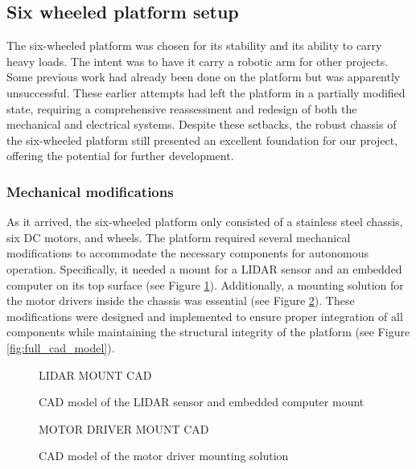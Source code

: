 \documentclass[11pt]{article}
\begin{document}
    \subsection{Six wheeled platform setup}

        The six-wheeled platform was chosen for its stability and its ability to carry heavy loads. The intent was to have it carry a robotic arm for other projects. Some previous work had already been done on the platform but was apparently unsuccessful. These earlier attempts had left the platform in a partially modified state, requiring a comprehensive reassessment and redesign of both the mechanical and electrical systems. Despite these setbacks, the robust chassis of the six-wheeled platform still presented an excellent foundation for our project, offering the potential for further development.

        \subsubsection{Mechanical modifications}
        As it arrived, the six-wheeled platform only consisted of a stainless steel chassis, six DC motors, and wheels. The platform required several mechanical modifications to accommodate the necessary components for autonomous operation. Specifically, it needed a mount for a LIDAR sensor and an embedded computer on its top surface (see Figure \ref{fig:LIDAR_mount}). Additionally, a mounting solution for the motor drivers inside the chassis was essential (see Figure \ref{fig:motor_driver_mount}). These modifications were designed and implemented to ensure proper integration of all components while maintaining the structural integrity of the platform (see Figure \ref{fig:full_cad_model}).

        \begin{figure}[htbp]
            \centering
            LIDAR MOUNT CAD
            \caption{CAD model of the LIDAR sensor and embedded computer mount}
            \label{fig:LIDAR_mount}
        \end{figure}
        
        \begin{figure}[htbp]
            \centering
            MOTOR DRIVER MOUNT CAD
            \caption{CAD model of the motor driver mounting solution}
            \label{fig:motor_driver_mount}
        \end{figure}
        
\end{document}
